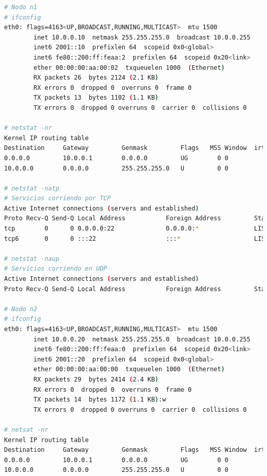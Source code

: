 \begingroup
    \fontsize{9pt}{10pt}\selectfont
\begin{lstlisting}[language=bash,breaklines=true]
# Nodo n1
# ifconfig
eth0: flags=4163<UP,BROADCAST,RUNNING,MULTICAST>  mtu 1500
        inet 10.0.0.10  netmask 255.255.255.0  broadcast 10.0.0.255
        inet6 2001::10  prefixlen 64  scopeid 0x0<global>
        inet6 fe80::200:ff:feaa:2  prefixlen 64  scopeid 0x20<link>
        ether 00:00:00:aa:00:02  txqueuelen 1000  (Ethernet)
        RX packets 26  bytes 2124 (2.1 KB)
        RX errors 0  dropped 0  overruns 0  frame 0
        TX packets 13  bytes 1102 (1.1 KB)
        TX errors 0  dropped 0 overruns 0  carrier 0  collisions 0

# netstat -nr
Kernel IP routing table
Destination     Gateway         Genmask         Flags   MSS Window  irtt Iface
0.0.0.0         10.0.0.1        0.0.0.0         UG        0 0          0 eth0
10.0.0.0        0.0.0.0         255.255.255.0   U         0 0          0 eth0

# netstat -natp
# Servicios corriendo por TCP
Active Internet connections (servers and established)
Proto Recv-Q Send-Q Local Address           Foreign Address         State       PID/Program name    
tcp        0      0 0.0.0.0:22              0.0.0.0:*               LISTEN      28/sshd             
tcp6       0      0 :::22                   :::*                    LISTEN      28/sshd  

# netstat -naup
# Servicios corriendo en UDP
Active Internet connections (servers and established)
Proto Recv-Q Send-Q Local Address           Foreign Address         State       PID/Program name

# Nodo n2
# ifconfig 
eth0: flags=4163<UP,BROADCAST,RUNNING,MULTICAST>  mtu 1500
        inet 10.0.0.20  netmask 255.255.255.0  broadcast 10.0.0.255
        inet6 fe80::200:ff:feaa:0  prefixlen 64  scopeid 0x20<link>
        inet6 2001::20  prefixlen 64  scopeid 0x0<global>
        ether 00:00:00:aa:00:00  txqueuelen 1000  (Ethernet)
        RX packets 29  bytes 2414 (2.4 KB)
        RX errors 0  dropped 0  overruns 0  frame 0
        TX packets 14  bytes 1172 (1.1 KB):w
        TX errors 0  dropped 0 overruns 0  carrier 0  collisions 0

# netsat -nr 
Kernel IP routing table
Destination     Gateway         Genmask         Flags   MSS Window  irtt Iface
0.0.0.0         10.0.0.1        0.0.0.0         UG        0 0          0 eth0
10.0.0.0        0.0.0.0         255.255.255.0   U         0 0          0 eth0



\end{lstlisting}

